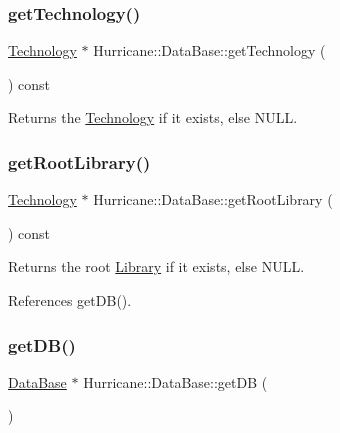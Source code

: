 \subsubsection{\texorpdfstring{get\+Technology()}{getTechnology()}}
{\footnotesize\ttfamily \hyperlink{classHurricane_1_1Technology}{Technology} $\ast$ Hurricane\+::\+Data\+Base\+::get\+Technology (\begin{DoxyParamCaption}{ }\end{DoxyParamCaption}) const\hspace{0.3cm}{\ttfamily [inline]}}

\begin{DoxyReturn}{Returns}
the \hyperlink{classHurricane_1_1Technology}{Technology} if it exists, else {\ttfamily N\+U\+LL}. 
\end{DoxyReturn}
\mbox{\label{classHurricane_1_1DataBase_a4469391a3c5ae82caf090f1bdac4f29b}} 
\subsubsection{\texorpdfstring{get\+Root\+Library()}{getRootLibrary()}}
{\footnotesize\ttfamily \hyperlink{classHurricane_1_1Technology}{Technology} $\ast$ Hurricane\+::\+Data\+Base\+::get\+Root\+Library (\begin{DoxyParamCaption}{ }\end{DoxyParamCaption}) const\hspace{0.3cm}{\ttfamily [inline]}}

\begin{DoxyReturn}{Returns}
the root \hyperlink{classHurricane_1_1Library}{Library} if it exists, else {\ttfamily N\+U\+LL}. 
\end{DoxyReturn}


References get\+D\+B().

\mbox{\label{classHurricane_1_1DataBase_a53d0b9fcd06b73f3968c8f238f377a88}} 
\subsubsection{\texorpdfstring{get\+D\+B()}{getDB()}}
{\footnotesize\ttfamily \hyperlink{classHurricane_1_1DataBase}{Data\+Base} $\ast$ Hurricane\+::\+Data\+Base\+::get\+DB (\begin{DoxyParamCaption}{ }\end{DoxyParamCaption})\hspace{0.3cm}{\ttfamily [static]}}

